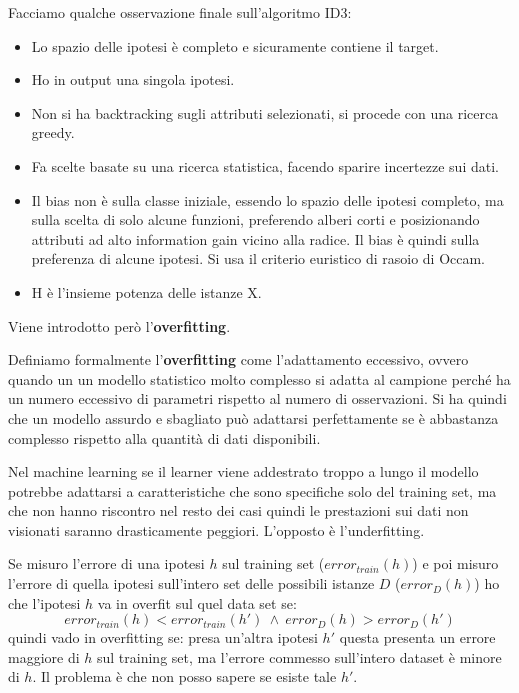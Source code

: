 Facciamo qualche osservazione finale sull'algoritmo ID3:
\begin{itemize}
    \item Lo spazio delle ipotesi è completo e sicuramente contiene il target.
    \item Ho in output una singola ipotesi.
    \item Non si ha backtracking sugli attributi selezionati, si procede con una
          ricerca greedy.
    \item Fa scelte basate su una ricerca statistica, facendo sparire incertezze
          sui dati.
    \item Il bias non è sulla classe iniziale, essendo lo spazio delle ipotesi
          completo, ma sulla scelta di solo alcune funzioni, preferendo alberi corti e
          posizionando attributi ad alto information gain vicino alla radice. Il bias è
          quindi sulla preferenza di alcune ipotesi. Si usa il criterio euristico
          di rasoio di Occam.
    \item H è l'insieme potenza delle istanze X.
\end{itemize}

Viene introdotto però l'\textbf{overfitting}.
\begin{definizione}
    Definiamo formalmente l'\textbf{overfitting} come l'adattamento eccessivo,
    ovvero quando un un modello statistico molto complesso si adatta al campione
    perché ha un numero eccessivo di parametri rispetto al numero di osservazioni.
    Si ha quindi che un modello assurdo e sbagliato può adattarsi perfettamente se
    è abbastanza complesso rispetto alla quantità di dati disponibili.

    Nel machine learning se il learner viene addestrato troppo a lungo il modello
    potrebbe adattarsi a caratteristiche che sono specifiche solo del training set,
    ma che non hanno riscontro nel resto dei casi quindi le prestazioni sui dati
    non visionati saranno drasticamente peggiori. L'opposto è l'underfitting.
\end{definizione}

Se misuro l'errore di una ipotesi $h$ sul training set ($error_{train}(h)$) e poi
misuro l'errore di quella ipotesi sull'intero set delle possibili istanze $D$ ($error_D(h)$)
ho che l'ipotesi $h$ va in overfit sul quel data set se:
\begin{equation}
    error_{train}(h) < error_{train}(h') \ \land \ error_D(h) > error_D(h')
\end{equation}
quindi vado in overfitting se: presa un'altra ipotesi $h'$ questa presenta un
errore maggiore di $h$ sul training set, ma l'errore commesso sull'intero dataset
è minore di $h$. Il problema è che non posso sapere se esiste tale $h'$.

